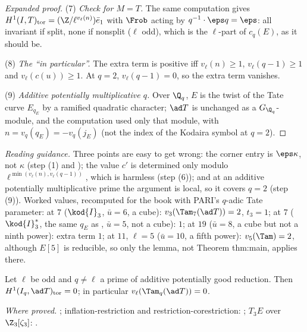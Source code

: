 \begin{sloppypar}
\begin{proof}[Expanded proof]
(7) \emph{Check for $M=T$.} The same computation gives $H^1(I,T)_{\mathrm{tor}}=(\Z/\ell^{v_\ell(n)})\bar e_1$ with $\Frob$ acting by $q^{-1}\cdot\eps q=\eps$: all invariant if split, none if nonsplit
($\ell$ odd), which is the $\ell$-part of $c_q(E)$, as it should be.

(8) \emph{The ``in particular''.} The extra term is positive iff $v_\ell(n)\ge1$, $v_\ell(q-1)\ge1$ and $v_\ell(c(u))\ge1$. At $q=2$, $v_\ell(q-1)=0$, so the extra term vanishes.

(9) \emph{Additive potentially multiplicative $q$.} Over $\Q_q$, $E$ is the twist of the Tate curve $E_{q_E}$ by a ramified quadratic character; $\ad T$ is unchanged as a $G_{\Q_q}$-module, and the
computation used only that module, with $n=v_q(q_E)=-v_q(j_E)$ (not the index of the Kodaira symbol at $q=2$).
\end{proof}

\noindent\emph{Reading guidance.} Three points are easy to get wrong: the corner entry is $\eps\kappa$, not $\kappa$ (step (1) and ); the value $c'$ is
determined only modulo $\ell^{\min(v_\ell(n),v_\ell(q-1))}$, which is harmless (step (6)); and at an additive potentially multiplicative prime the argument is local, so it
covers $q=2$ (step (9)). Worked values, recomputed for the book with PARI's $q$-adic
Tate parameter:  at $7$ ($\kod{I}_3$, $\bar u=6$, a cube): $v_3(\Tam_7(\ad T))=2$, $t_3=1$;  at $7$ ($\kod{I}_3^*$, the same $q_E$ as , $\bar u=5$, not a
cube): $1$;  at $19$ ($\bar u=8$, a cube but not a ninth power): extra term $1$;  at $11$, $\ell=5$ ($\bar u=10$, a fifth power): $v_5(\Tam)=2$, although $E[5]$ is
reducible, so only the lemma, not Theorem thm:main, applies there.

\begin{lemma}\label{lem:paper:tamadd}
Let $\ell$ be odd and $q\ne\ell$ a prime of additive potentially good reduction. Then $H^1(I_q,\ad T)_{\mathrm{tor}}=0$; in particular $v_\ell(\Tam_q(\ad T))=0$.
\end{lemma}

\noindent\emph{Where proved.} ; inflation-restriction and restriction-corestriction: ; $T_3E$ over $\Z_3[\zeta_3]$: .


\end{sloppypar}

